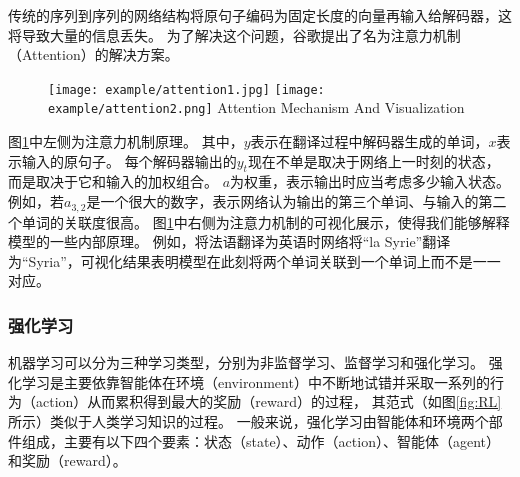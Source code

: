 传统的序列到序列的网络结构将原句子编码为固定长度的向量再输入给解码器，这将导致大量的信息丢失。
为了解决这个问题，谷歌提出了名为注意力机制（Attention）的解决方案。

\begin{figure}[htbp]
  \centering
  \texttt{[image: example/attention1.jpg]}
  \texttt{[image: example/attention2.png]}
    {Attention Mechanism And Visualization}
\label{fig:attention} 
\end{figure}

图\ref{fig:attention}中左侧为注意力机制原理。
其中，$y$表示在翻译过程中解码器生成的单词，$x$表示输入的原句子。
每个解码器输出的$y_t$现在不单是取决于网络上一时刻的状态，而是取决于它和输入的加权组合。
$a$为权重，表示输出时应当考虑多少输入状态。
例如，若$a_{3,2}$是一个很大的数字，表示网络认为输出的第三个单词、与输入的第二个单词的关联度很高。
图\ref{fig:attention}中右侧为注意力机制的可视化展示，使得我们能够解释模型的一些内部原理。
例如，将法语翻译为英语时网络将“la Syrie”翻译为“Syria”，可视化结果表明模型在此刻将两个单词关联到一个单词上而不是一一对应。

\subsubsection{强化学习}

机器学习可以分为三种学习类型，分别为非监督学习、监督学习和强化学习。
强化学习是主要依靠智能体在环境（environment）中不断地试错并采取一系列的行为（action）从而累积得到最大的奖励（reward）的过程，
其范式（如图\ref{fig:RL}所示）类似于人类学习知识的过程。
一般来说，强化学习由智能体和环境两个部件组成，主要有以下四个要素：状态（state）、动作（action）、智能体（agent）和奖励（reward）。

